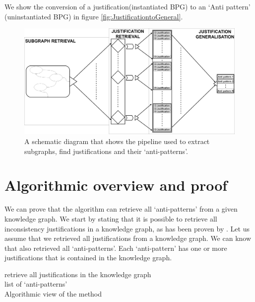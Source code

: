 \documentclass[11pt,letterpaper ,oneside ]{book}
\begin{document}
	We show the conversion of a justification(instantiated BPG) to an `Anti pattern' (uninstantiated BPG) in figure \ref{fig:JustificationtoGeneral}.
	
	\begin{figure}
		\includegraphics[width=\linewidth]{images/SimplifiedPipelineMissingPart.png}
		\caption{A schematic diagram that shows the pipeline used to extract subgraphs, find justifications and their `anti-patterns'.}
		\label{fig:simplePipeline}
	\end{figure}
	
	\section{Algorithmic overview and proof}
	We can prove that the algorithm can retrieve all `anti-patterns' from a given knowledge graph. We start by stating that it is possible to retrieve all inconsistency justifications in a knowledge graph, as has been proven by \cite{Horridge:2009}. Let us assume that we retrieved all justifications from a knowledge graph. We can know that also retrieved all `anti-patterns'. Each `anti-pattern' has one or more justifications that is contained in the knowledge graph. \\
	
	\begin{algorithm}
		
		retrieve all justifications in the knowledge graph\\
		\Return list of `anti-patterns'\\
		\caption{Algorithmic view of the method}
	\end{algorithm}
	
\end{document}
